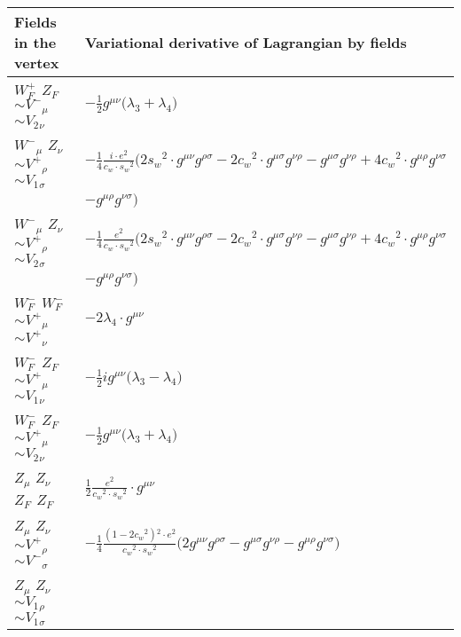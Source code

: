 \begin{center}
\begin{tabular}{|l|l|} \hline
Fields in the vertex & Variational derivative of Lagrangian by fields \\ \hline
$W^+_F{}_{}$ \phantom{-} $Z_F{}_{}$ \phantom{-} $\sim V^-{}_{\mu }$ \phantom{-} $\sim V_2{}_{\nu }$ \phantom{-}  &
	$-\frac{1}{2}g^{\mu \nu} \big( \lambda_3+ \lambda_4\big)$\\[2mm]
$W^-{}_{\mu }$ \phantom{-} ${Z}_{\nu }$ \phantom{-} $\sim V^+{}_{\rho }$ \phantom{-} $\sim V_1{}_{\sigma }$ \phantom{-}  &
	$-\frac{1}{4}\frac{ i \cdot e{}^2 }{ c_w \cdot s_w{}^2 }\big(2 s_w{}^2 \cdot g^{\mu \nu} g^{\rho \sigma} -2 c_w{}^2 \cdot g^{\mu \sigma} g^{\nu \rho} -g^{\mu \sigma} g^{\nu \rho} +4 c_w{}^2 \cdot g^{\mu \rho} g^{\nu \sigma} $ \\[2mm]
  & $-g^{\mu \rho} g^{\nu \sigma} \big)$\\[2mm]
$W^-{}_{\mu }$ \phantom{-} ${Z}_{\nu }$ \phantom{-} $\sim V^+{}_{\rho }$ \phantom{-} $\sim V_2{}_{\sigma }$ \phantom{-}  &
	$-\frac{1}{4}\frac{ e{}^2 }{ c_w \cdot s_w{}^2 }\big(2 s_w{}^2 \cdot g^{\mu \nu} g^{\rho \sigma} -2 c_w{}^2 \cdot g^{\mu \sigma} g^{\nu \rho} -g^{\mu \sigma} g^{\nu \rho} +4 c_w{}^2 \cdot g^{\mu \rho} g^{\nu \sigma} $ \\[2mm]
  & $-g^{\mu \rho} g^{\nu \sigma} \big)$\\[2mm]
$W^-_F{}_{}$ \phantom{-} $W^-_F{}_{}$ \phantom{-} $\sim V^+{}_{\mu }$ \phantom{-} $\sim V^+{}_{\nu }$ \phantom{-}  &
	$-2 \lambda_4\cdot g^{\mu \nu} $\\[2mm]
$W^-_F{}_{}$ \phantom{-} $Z_F{}_{}$ \phantom{-} $\sim V^+{}_{\mu }$ \phantom{-} $\sim V_1{}_{\nu }$ \phantom{-}  &
	$-\frac{1}{2} ig^{\mu \nu} \big( \lambda_3- \lambda_4\big)$\\[2mm]
$W^-_F{}_{}$ \phantom{-} $Z_F{}_{}$ \phantom{-} $\sim V^+{}_{\mu }$ \phantom{-} $\sim V_2{}_{\nu }$ \phantom{-}  &
	$-\frac{1}{2}g^{\mu \nu} \big( \lambda_3+ \lambda_4\big)$\\[2mm]
${Z}_{\mu }$ \phantom{-} ${Z}_{\nu }$ \phantom{-} $Z_F{}_{}$ \phantom{-} $Z_F{}_{}$ \phantom{-}  &
	$\frac{1}{2}\frac{ e{}^2 }{ c_w{}^2  \cdot s_w{}^2 }\cdot g^{\mu \nu} $\\[2mm]
${Z}_{\mu }$ \phantom{-} ${Z}_{\nu }$ \phantom{-} $\sim V^+{}_{\rho }$ \phantom{-} $\sim V^-{}_{\sigma }$ \phantom{-}  &
	$-\frac{1}{4}\frac{ (1-2 c_w {}^2){}^2  \cdot e{}^2 }{ c_w{}^2  \cdot s_w{}^2 }\big(2g^{\mu \nu} g^{\rho \sigma} -g^{\mu \sigma} g^{\nu \rho} -g^{\mu \rho} g^{\nu \sigma} \big)$\\[2mm]
${Z}_{\mu }$ \phantom{-} ${Z}_{\nu }$ \phantom{-} $\sim V_1{}_{\rho }$ \phantom{-} $\sim V_1{}_{\sigma }$ \phantom{-}  &

\end{tabular}
\end{center}
